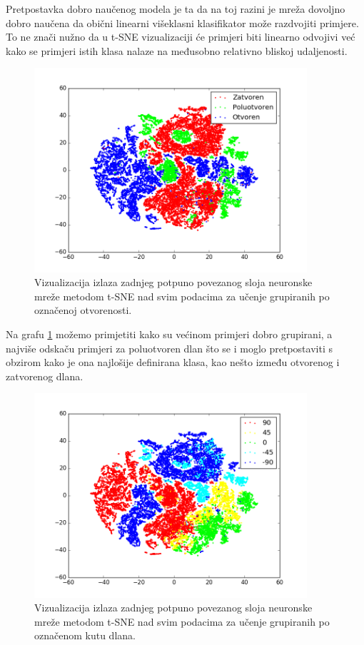 \documentclass[times, utf8, diplomski, numeric]{fer}
\begin{document}
Pretpostavka dobro naučenog modela je ta da na toj razini je mreža dovoljno dobro naučena da obični linearni višeklasni klasifikator može razdvojiti primjere. To ne znači nužno da u t-SNE vizualizaciji će primjeri biti linearno odvojivi već kako se primjeri istih klasa nalaze na međusobno relativno bliskoj udaljenosti.

\begin{figure}[h!]
\centering
\includegraphics[width = 0.9\textwidth]{detekcija/train_otvorenost}
\caption{Vizualizacija izlaza zadnjeg potpuno povezanog sloja neuronske mreže metodom t-SNE nad svim podacima za učenje grupiranih po označenoj otvorenosti.} \label{tsne-otvorenost}
\end{figure}

Na grafu \ref{tsne-otvorenost} možemo primjetiti kako su većinom primjeri dobro grupirani, a najviše odskaču primjeri za poluotvoren dlan što se i moglo pretpostaviti s obzirom kako je ona najlošije definirana klasa, kao nešto između otvorenog i zatvorenog dlana.

\begin{figure}[h!]
\centering
\includegraphics[width = 0.9\textwidth]{detekcija/train_kut}
\caption{Vizualizacija izlaza zadnjeg potpuno povezanog sloja neuronske mreže metodom t-SNE nad svim podacima za učenje grupiranih po označenom kutu dlana.} \label{tsne-kut}
\end{figure}
\end{document}
